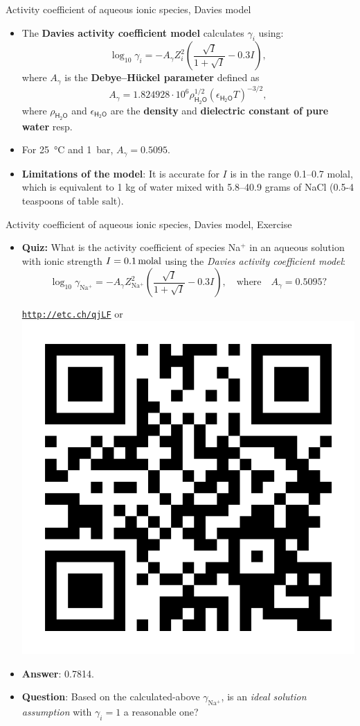 \begin{frame}{Activity coefficient of aqueous ionic species, Davies model}
\begin{itemize}[<+->]
\item The \alert{\textbf{Davies activity coefficient model} } calculates $\gamma_{i}$
using:
\[
\boxed{\log_{10}\gamma_{i}=-A_{\gamma}Z_{i}^{2}\left(\dfrac{\sqrt{I}}{1+\sqrt{I}}-0.3I\right),}
\]
where $A_{\gamma}$ is the \textbf{Debye–Hückel parameter} defined as
\[
A_{\gamma}=1.824928\cdot10^{6}\rho_{\mathsf{H_{2}O}}^{1/2}(\epsilon_{\mathsf{H_{2}O}}T)^{-3/2},
\]
%
where $\rho_{\mathsf{H_{2}O}}$ and $\epsilon_{\mathsf{H_{2}O}}$
are the \textbf{density} and \textbf{dielectric constant of pure water} resp. 
\item For 25~°C and 1~bar, $A_{\gamma}=0.5095$.
\item \textbf{Limitations of the model}: 
It is accurate for $I$ is in the range 0.1–0.7 molal, which is equivalent to 1 kg of water mixed with 5.8–40.9 grams of NaCl (0.5-4 teaspoons of table salt).
\end{itemize}
\end{frame}
%
%
\begin{frame}{Activity coefficient of aqueous ionic species, Davies model, Exercise}

\begin{itemize}
\item \alert{\textbf{Quiz:}} What is the activity coefficient of species Na$^{+}$ in an aqueous solution with ionic strength $I=\unit[0.1]{molal}$ using the \emph{Davies activity coefficient model}:
\[
\log_{10}\gamma_{\mathrm{Na^{+}}}=-A_{\gamma}Z_{\mathrm{Na^{+}}}^{2}\left(\dfrac{\sqrt{I}}{1+\sqrt{I}}-0.3I\right), \quad \mbox{where} \quad A_{\gamma}=0.5095?
\]
%
\begin{center}
\href{http://etc.ch/qjLF}{\textcolor{indigo(dye)}{\tt http://etc.ch/qjLF}} \quad or \quad 
\includegraphics[height=0.18\columnwidth]{figures/activity-models/poll-ionic-strength.png}
\end{center}
%
\vskip 10pt
\hiddenpause
\item \textbf{Answer}: 0.7814.
\pause
\item \textbf{Question}: Based on the calculated-above $\gamma_{\mathrm{Na^{+}}}$, is an \emph{ideal solution assumption} with $\gamma_{i}=1$ a reasonable one?
\end{itemize}
\end{frame}
